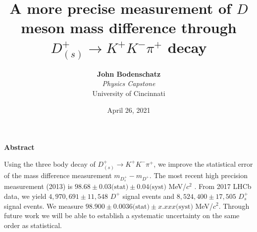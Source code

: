 \documentclass[12pt, letterpaper]{article}
\title{A more precise measurement of $D$ meson mass difference through $D^{+}_{(s)} \rightarrow K^{+}K^{-}\pi^{+}$ decay\vspace{5mm}}
\author{\vspace{3mm} \textbf{John Bodenschatz}\\
	\vspace{3mm}
  \textit{Physics Capstone}\\
  University of Cincinnati\\}
\date{\vspace{5mm} April 26, 2021}
\begin{document}
\maketitle

\begin{center}
\textbf{Abstract}
\end{center}
Using the three body decay of $D^{+}_{(s)} \rightarrow K^{+}K^{-}\pi^{+}$, we improve the statistical error of the mass difference measurement $m_{D^+_s} - m_{D^+}$. The most recent high precision measurement (2013) is $98.68 \pm 0.03\text{(stat)} \pm 0.04\text{(syst)}$ MeV/$c^2$ \cite{lhcb}. From 2017 LHCb data, we yield $4,970,691 \pm 11,548$ $D^+$ signal events and $8,524,400 \pm 17,505$ $D^+_s$ signal events. We measure $98.900 \pm 0.0036\text{(stat)} \pm x.xxx\text{(syst)}$ MeV/$c^2$. Through future work we will be able to establish a systematic uncertainty on the same order as statistical.











\newpage
\end{document}
